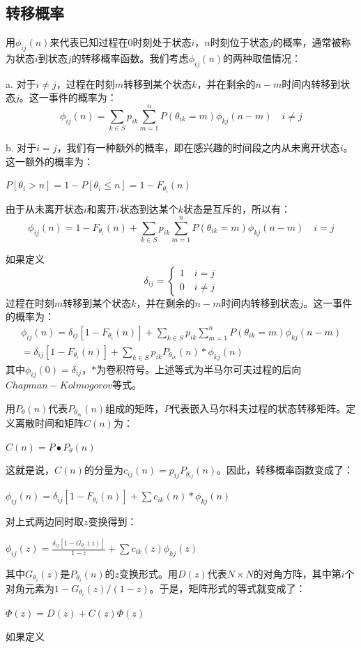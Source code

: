 \documentclass[UTF8]{ctexart}
\begin{document}
\subsection{转移概率}

用$\phi_{ij}(n)$来代表已知过程在$0$时刻处于状态$i$，$n$时刻位于状态$j$的概率，通常被称为状态$i$到状态$j$的转移概率函数。我们考虑$\phi_{ij}(n)$的两种取值情况：

a. 对于$i\ne j$，过程在时刻$m$转移到某个状态$k$，并在剩余的$n-m$时间内转移到状态$j$。这一事件的概率为：
$$\phi_{ij}(n)=\sum_{k \in S} p_{ik}\sum_{m=1}^n P(\theta_{ik}=m)\phi_{kj}(n-m) \quad i \ne j$$

b. 对于$i=j$，我们有一种额外的概率，即在感兴趣的时间段之内从未离开状态$i$。这一额外的概率为：
\begin{center}
$P[\theta_i>n]=1-P[\theta_i \le n]=1-F_{\theta_i}(n)$ 
\end{center}
由于从未离开状态$i$和离开$i$状态到达某个$k$状态是互斥的，所以有：
$$\phi_{ij}(n)=1-F_{\theta_i}(n)+\sum_{k \in S} p_{ik}\sum_{m=1}^n P(\theta_{ik}=m)\phi_{kj}(n-m) \quad i = j$$

如果定义
$$\delta_{ij}=
\begin{cases}
1 \quad i=j  \\
0 \quad i \ne j
\end{cases}$$
过程在时刻$m$转移到某个状态$k$，并在剩余的$n-m$时间内转移到状态$j$。这一事件的概率为：
$$
\begin{aligned}
\phi_{ij}(n)=\delta_{ij}[1-F_{\theta_i}(n)]+\sum_{k \in S} p_{ik}\sum_{m=1}^n P(\theta_{ik}=m)\phi_{kj}(n-m)
 \\=\delta_{ij}[1-F_{\theta_i}(n)]+\sum_{k\in S} p_{ik}P_{\theta_{ik}}(n)*\phi_{kj}(n) 
\end{aligned}
$$
其中$\phi_{ij}(0)=\delta_{ij}$，$*$为卷积符号。上述等式为半马尔可夫过程的后向$Chapman-Kolmogorov$等式。

用$P_\theta(n)$代表$P_{\theta_{ik}}(n)$组成的矩阵，$P$代表嵌入马尔科夫过程的状态转移矩阵。定义离散时间和矩阵$C(n)$为：
\begin{center}
$C(n)=P\bullet P_\theta(n)$
\end{center}

这就是说，$C(n)$的分量为$c_{ij}(n)=p_{ij}P_{\theta_{ij}}(n)$。因此，转移概率函数变成了：
\begin{center}
$\phi_{ij}(n)=\delta_{ij}[1-F_{\theta_i}(n)]+\sum c_{ik}(n)*\phi_{kj}(n) $
\end{center}
对上式两边同时取$z$变换得到：
\begin{center}
$\phi_{ij}(z)=\frac{\delta_{ij}[1-G_{\theta_i}(z)]}{1-z}+\sum c_{ik}(z)\phi_{kj}(z) $
\end{center}
其中$G_{\theta_i}(z)$是$P_{\theta_i}(n)$的$z$变换形式。用$D(z)$代表$N\times N$的对角方阵，其中第$i$个对角元素为${1-G_{\theta_i}(z)}/(1-z)$。于是，矩阵形式的等式就变成了：
\begin{center}
$\Phi(z)=D(z)+C(z)\Phi(z) $
\end{center}
如果定义
\end{document}
